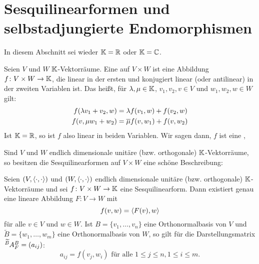 \section{Sesquilinearformen und selbstadjungierte Endomorphismen}
\label{sec:2.5}

In diesem Abschnitt sei wieder $\mathbb{K} = \mathbb{R}$ oder $\mathbb{K}= \mathbb{C}$.

\begin{definition}
	\label{def:5.1}
	Seien $V$ und $W$ $\mathbb{K}$-Vektorräume.
	Eine  auf $V \times W$ ist eine Abbildung $f \colon V \times W \rightarrow \mathbb{K}$, die linear in der ersten und konjugiert linear (oder antilinear) in der zweiten Variablen ist.
	Das heißt, für $\lambda, \mu \in \mathbb{K}$, $v_1,v_2,v \in V$ und $w_1,w_2,w \in W$ gilt:
	\begin{align*}
		f(\lambda v_1 + v_2, w) &= \lambda f(v_1,w) + f(v_2,w) \\
		f(v,\mu w_1 + w_2) &= \overline{\mu} f(v,w_1) + f(v,w_2)
	\end{align*}
	Ist $\mathbb{K}= \mathbb{R}$, so ist $f$ also linear in beiden Variablen.
	Wir sagen dann, $f$ ist eine ,
\end{definition}

Sind $V$ und $W$ endlich dimensionale unitäre (bzw. orthogonale) $\mathbb{K}$-Vektorräume, so besitzen die Sesquilinearformen auf $V \times W$ eine schöne Beschreibung:

\begin{satz}
	\label{satz:5.2}
	Seien $(V,\left\langle\cdot,\cdot\right\rangle)$ und $(W,\left\langle\cdot,\cdot\right\rangle)$ endlich dimensionale unitäre (bzw. orthogonale) $\mathbb{K}$-Vektorräume und sei $f \colon V \times W \rightarrow \mathbb{K}$ eine Sesquilinearform.
	Dann existiert genau eine lineare Abbildung $F \colon V \rightarrow W$ mit
	\[
		f(v,w) = \left\langle F(v),w\right\rangle
	\]
	für alle $v \in V$ und $w \in W$.
	Ist $B = \{v_1,\dots,v_n\}$ eine Orthonormalbasis von $V$ und $\widetilde{B} = \{w_1,\dots,w_m\}$ eine Orthonormalbasis von $W$, so gilt für die Darstellungsmatrix $\mat{A}{\wt{B}}{B}{F} = (a_{ij})$:
	\[
		a_{ij} = f(v_j,w_i)	\text{ für alle } 1\leq j \leq n, 1 \leq i \leq m.
	\]
\end{satz}

